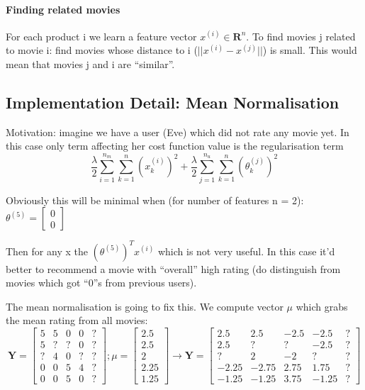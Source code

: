 \documentclass{scrartcl}
\begin{document}
\paragraph{Finding related movies}

For each product i we learn a feature vector $x^{(i)} \in
\mathbf{R}^n$. To find movies j related to movie i: find movies whose
distance to i ($||x^{(i)} - x^{(j)}||$) is small. This would mean that
movies j and i are ``similar''. 

\subsection{Implementation Detail: Mean Normalisation}
\label{sec:16-6}

Motivation: imagine we have a user (Eve) which did not rate any movie
yet. In this case only term affecting her cost function value is the
regularisation term \[\frac{\lambda}{2} \sum \limits_{i=1}^{n_m} \sum
\limits_{k=1}^n(x_k^{(i)})^2 + \frac{\lambda}{2} \sum
\limits_{j=1}^{n_u} \sum \limits_{k=1}^n (\theta_k^{(j)})^2\]

Obviously this will be minimal when (for number of features n = 2):
$\theta^{(5)} = \left[ \begin{array}{c}  0 \\ 0 \end{array} \right]$

Then for any x the $(\theta^{(5)})^T x^{(i)}$ which is not very
useful. In this case it'd better to recommend a movie with ``overall''
high rating (do distinguish from movies which got ``0''s from previous
users). 

The mean normalisation is going to fix this. We compute vector $\mu$
which grabs the mean rating from all movies:
\[ \mathbf{Y} = \left[ 
\begin{array}{ccccc}
  5 & 5 & 0 & 0 & ?\\
  5 & ? & ? & 0 & ? \\
  ? & 4 & 0 & ? & ? \\
  0 & 0 & 5 & 4 & ? \\
  0 & 0 & 5 & 0 & ?
\end{array} \right]; 
\mu = \left[\begin{array}{c}  2.5 \\ 2.5 \\ 2 \\ 2.25 \\
    1.25\end{array}\right]  \to
\mathbf{Y} = \left[ 
\begin{array}{ccccc}
  2.5 & 2.5 & -2.5 & -2.5 & ? \\
  2.5 & ? & ? & -2.5 & ? \\
  ? & 2 & -2 & ? & ? \\
  -2.25 & -2.75 & 2.75 & 1.75 & ? \\
  -1.25 & -1.25 & 3.75 & -1.25  & ?
\end{array} \right]
 \]
\end{document}
